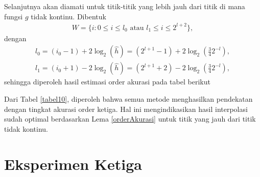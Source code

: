 Selanjutnya akan diamati untuk titik-titik yang lebih jauh dari titik di mana fungsi $g$ tidak kontinu. Dibentuk
\begin{align*}
    W = \{ i: 0 \leq i \leq l_0 \text{ atau } l_1 \leq i \leq 2^{l+2} \},
\end{align*}
dengan
\begin{align*}
    l_0 = (i_0 - 1) + 2\log_2(\hat{h}) = (2^{l+1} - 1) + 2\log_2(\frac{3}{4} 2^{-l}), \\
    l_1 = (i_0 + 1) - 2\log_2(\hat{h}) = (2^{l+1} + 2) - 2\log_2(\frac{3}{4} 2^{-l}),
\end{align*}
sehingga diperoleh hasil estimasi order akurasi pada tabel berikut
\begin{table}[htp]
        \centering
        \caption{Tabel estimasi order akurasi eksperimen kedua dengan interval tidak sama besar $\hat{h}=\frac{3}{4}2^{-l}$, $5 \leq l \leq 8$, $W=\{ i : 1\leq i \leq l_0 $ atau $l_1 \leq i \leq 2^{l+1}- 1\}$, $l_0 = (2^{l+1} - 1) + 2\log_2(\frac{3}{4}2^{-l})$ dan $l_1 = (2^{l+1} + 2) - 2\log_2(\frac{3}{4}2^{-l})$}
        \label{tabel10}
    \end{table}

Dari Tabel \ref{tabel10}, diperoleh bahwa semua metode menghasilkan pendekatan dengan tingkat akurasi order ketiga. Hal ini mengindikasikan hasil interpolasi sudah optimal berdasarkan Lema \ref{orderAkurasi} untuk titik yang jauh dari titik tidak kontinu.

\section{Eksperimen Ketiga}

